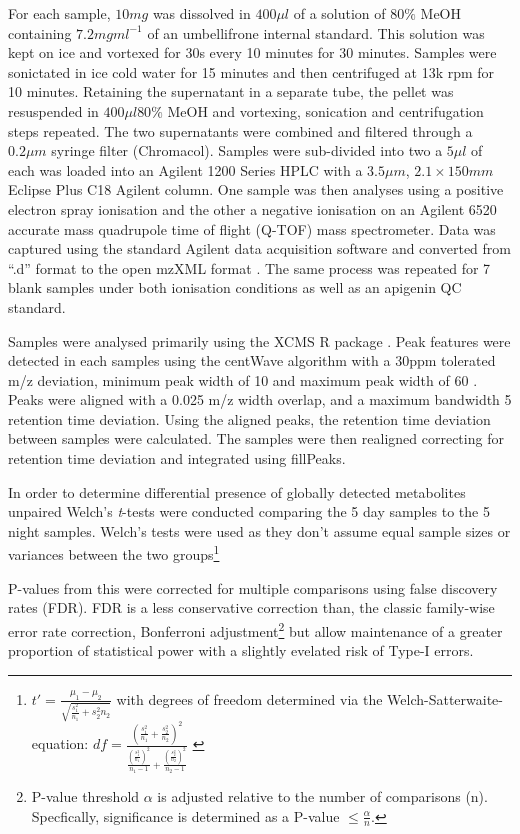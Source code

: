 For each sample, \(10mg\) was dissolved in \(400\mu l\)
of a solution of \(80\%\) MeOH containing \(7.2mg ml^{-1}\) of
an umbellifrone internal standard.  This solution was kept on ice
and vortexed for 30s every 10 minutes for 30 minutes.
Samples were sonictated in ice cold water for 15 minutes and then centrifuged
at 13k rpm for 10 minutes.  Retaining the supernatant in a separate tube, the pellet
was resuspended in \(400\mu l 80\%\) MeOH and vortexing, sonication and centrifugation
steps repeated.  The two supernatants were combined and filtered through 
a \(0.2\mu m\) syringe filter (Chromacol).  Samples were sub-divided into two 
a \(5\mu l\) of each was loaded into an Agilent 1200 Series HPLC with
a \(3.5\mu m\), \(2.1\times 150mm\) Eclipse Plus C18 Agilent column.
One sample was then analyses using a positive electron spray ionisation
and the other a negative ionisation on an Agilent 6520 accurate mass
quadrupole time of flight (Q-TOF) mass spectrometer. Data was captured
using the standard Agilent data acquisition software and converted
from ``.d'' format to the open mzXML format \citep{Pedrioli2004}.
The same process was repeated for 7 blank samples under both ionisation conditions
as well as an apigenin QC standard.

Samples were analysed primarily using the XCMS R package \citep{Smith2006,Tautenhahn2012}.
Peak features were detected in each samples using the centWave algorithm with a 30ppm tolerated m/z deviation,
minimum peak width of 10 and maximum peak width of 60 \citep{Tautenhahn2008}. 
Peaks were aligned with a 0.025 m/z width overlap, and a maximum bandwidth 5 retention time
deviation. Using the aligned peaks, the retention time deviation between samples were
calculated.  The samples were then realigned correcting for retention time deviation and
integrated using fillPeaks. 

In order to determine differential presence of globally detected metabolites
unpaired Welch's \textit{t}-tests were conducted comparing the 5 day samples to the 5
night samples. Welch's tests were used as they don't assume equal sample sizes or variances
between the two groups\citep{Welch1947}\footnote{
    \(t' = \frac{\mu_1 - \mu_2}{\sqrt{\frac{s^2_1}{n_1} + {s^2_2}{n_2}}}\)
    with degrees of freedom determined via the Welch-Satterwaite-equation:
    \(df = \frac{(\frac{s^2_1}{n_1} + \frac{s^2_2}{n_2})^2}{\frac{(\frac{s^2_1}{n_1})^2}{n_1 - 1} + \frac{(\frac{s^2_2}{n_2})^2}{n_2 - 1}}\)
    \citep{Ruxton2006}
}

P-values from this were corrected 
for multiple comparisons using false discovery rates (FDR).  FDR is a
less conservative correction than, the classic family-wise error rate correction,
Bonferroni adjustment\footnote{
    P-value threshold \(\alpha\) is adjusted relative to the number of comparisons (n). 
Specfically, significance is determined as a P-value \(\leq \frac{\alpha}{n}\).} but
allow maintenance of a greater proportion of statistical power with a 
slightly evelated risk of Type-I errors. 

